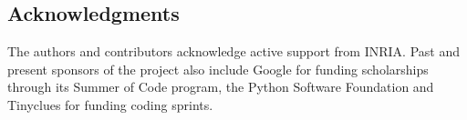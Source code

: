 \documentclass{llncs}
\DeclareRobustCommand{\VAN}[3]{#2}
\begin{document}
\subsection*{Acknowledgments}

The authors and contributors acknowledge active support from INRIA. Past and
present sponsors of the project also include Google for funding
scholarships through its Summer of Code program,
the Python Software Foundation and Tinyclues for funding coding sprints.

{\small

\DeclareRobustCommand{\VAN}[3]{#3}

}
\end{document}
